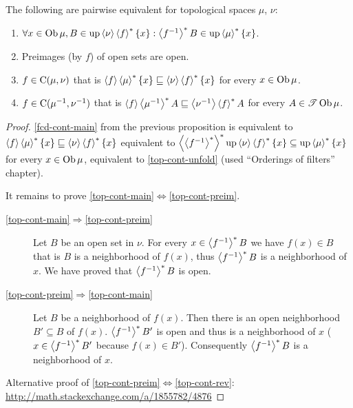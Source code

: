 \begin{cor}
  The following are pairwise equivalent for topological spaces $\mu$,
  $\nu$:
  \begin{enumerate}
    \item\label{top-cont-unfold} $\forall x \in \operatorname{Ob} \mu, B \in \operatorname{up} \left\langle \nu\right\rangle
    \left\langle f\right\rangle ^{\ast} \{x\} : \left\langle f^{- 1}\right\rangle ^{\ast} B \in
    \operatorname{up} \left\langle \mu\right\rangle ^{\ast} \{x\}$.

    \item\label{top-cont-preim} Preimages (by $f$) of open sets are open.

    \item\label{top-cont-main} $f \in \mathrm{C} (\mu, \nu)$ that is $\left\langle f\right\rangle
    \left\langle \mu\right\rangle ^{\ast} \{ x \} \sqsubseteq \left\langle \nu\right\rangle
    \left\langle f\right\rangle ^{\ast} \{ x \}$ for every $x \in \operatorname{Ob} \mu$.

    \item\label{top-cont-rev} $f \in \mathrm{C} (\mu^{- 1} , \nu^{- 1})$ that is $\left\langle f\right\rangle
    \left\langle \mu^{- 1}\right\rangle ^{\ast} A \sqsubseteq \left\langle \nu^{- 1}\right\rangle
    \left\langle f\right\rangle ^{\ast} A$ for every $A \in \mathscr{T}
    \operatorname{Ob} \mu$.
  \end{enumerate}
\end{cor}

\begin{proof}
  \ref{fcd-cont-main} from the previous proposition is equivalent to
  $\left\langle f\right\rangle\left\langle \mu\right\rangle ^{\ast}\{x\}\sqsubseteq\left\langle \nu\right\rangle\left\langle f\right\rangle ^{\ast}\{x\}$
  equivalent to $\left\langle \left\langle f^{- 1}\right\rangle ^{\ast}\right\rangle ^{\ast}
  \operatorname{up} \left\langle \nu\right\rangle \left\langle f\right\rangle ^{\ast} \{ x \} \subseteq
  \operatorname{up} \left\langle \mu\right\rangle ^{\ast} \{ x \}$ for every $x \in \operatorname{Ob}
  \mu$, equivalent to \ref{top-cont-unfold} (used ``Orderings of filters'' chapter).

  It remains to prove \ref{top-cont-main}$\Leftrightarrow$\ref{top-cont-preim}.

  \begin{description}
  \item[\ref{top-cont-main}$\Rightarrow$\ref{top-cont-preim}] Let $B$ be an open set in $\nu$. For every $x \in
  \left\langle f^{- 1}\right\rangle ^{\ast} B$ we have $f (x) \in B$ that is $B$ is a
  neighborhood of $f (x)$, thus $\left\langle f^{-1}\right\rangle ^{\ast}B$ is a neighborhood of $x$. We have
  proved that $\left\langle f^{- 1}\right\rangle ^{\ast} B$ is open.

  \item[\ref{top-cont-preim}$\Rightarrow$\ref{top-cont-main}] Let $B$ be a neighborhood of $f (x)$. Then there is an
  open neighborhood $B' \subseteq B$ of $f (x)$. $\left\langle f^{-1}\right\rangle ^{\ast}
  B'$ is open and thus is a neighborhood of $x$ ($x \in \left\langle f^{-1}\right\rangle ^{\ast} B'$ because $f (x) \in B'$). Consequently
  $\left\langle f^{-1}\right\rangle ^{\ast} B$ is a neighborhood of $x$.
  \end{description}

  Alternative proof of \ref{top-cont-preim}$\Leftrightarrow$\ref{top-cont-rev}:
  \url{http://math.stackexchange.com/a/1855782/4876}
\end{proof}

